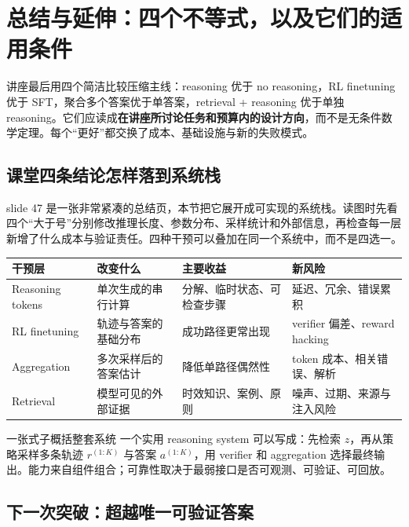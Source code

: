 \section{总结与延伸：四个不等式，以及它们的适用条件}

讲座最后用四个简洁比较压缩主线：reasoning 优于 no reasoning，RL finetuning 优于 SFT，聚合多个答案优于单答案，retrieval + reasoning 优于单独 reasoning。它们应读成\textbf{在讲座所讨论任务和预算内的设计方向}，而不是无条件数学定理。每个“更好”都交换了成本、基础设施与新的失败模式。

\subsection{课堂四条结论怎样落到系统栈}

slide 47 是一张非常紧凑的总结页，本节把它展开成可实现的系统栈。读图时先看四个“大于号”分别修改推理长度、参数分布、采样统计和外部信息，再检查每一层新增了什么成本与验证责任。四种干预可以叠加在同一个系统中，而不是四选一。


\begin{center}
\begin{tabularx}{0.97\textwidth}{p{}p{}X X}
\toprule
干预层 & 改变什么 & 主要收益 & 新风险 \\
\midrule
Reasoning tokens & 单次生成的串行计算 & 分解、临时状态、可检查步骤 & 延迟、冗余、错误累积 \\
RL finetuning & 轨迹与答案的基础分布 & 成功路径更常出现 & verifier 偏差、reward hacking \\
Aggregation & 多次采样后的答案估计 & 降低单路径偶然性 & token 成本、相关错误、解析 \\
Retrieval & 模型可见的外部证据 & 时效知识、案例、原则 & 噪声、过期、来源与注入风险 \\
\bottomrule
\end{tabularx}
\end{center}

\begin{importantbox}{一张式子概括整套系统}
一个实用 reasoning system 可以写成：先检索 $z$，再从策略采样多条轨迹 $r^{(1:K)}$ 与答案 $a^{(1:K)}$，用 verifier 和 aggregation 选择最终输出。能力来自组件组合；可靠性取决于最弱接口是否可观测、可验证、可回放。
\end{importantbox}

\subsection{下一次突破：超越唯一可验证答案}

